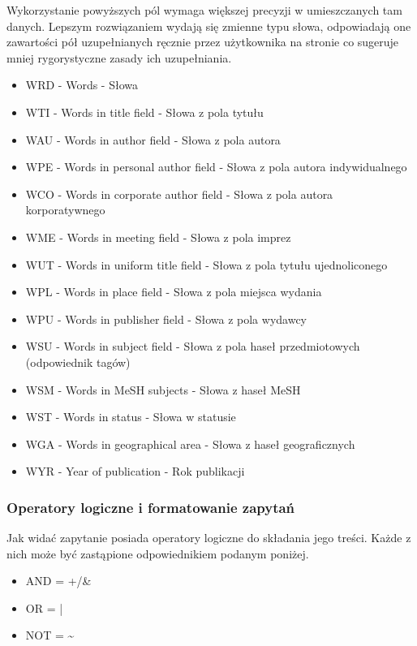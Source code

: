 \documentclass{report}
\begin{document}
				Wykorzystanie powyższych pól wymaga większej precyzji w umieszczanych tam danych. Lepszym rozwiązaniem wydają się zmienne typu słowa, odpowiadają one zawartości pół uzupełnianych ręcznie przez użytkownika na stronie co sugeruje mniej rygorystyczne zasady ich uzupełniania.
				
				\begin{itemize}
					\item WRD - Words - Słowa
					\item WTI - Words in title field - Słowa z pola tytułu
					\item WAU - Words in author field - Słowa z pola autora
					\item WPE - Words in personal author field - Słowa z pola autora indywidualnego
					\item WCO - Words in corporate author field - Słowa z pola autora korporatywnego
					\item WME - Words in meeting field - Słowa z pola imprez
					\item WUT - Words in uniform title field - Słowa z pola tytułu ujednoliconego
					\item WPL - Words in place field - Słowa z pola miejsca wydania
					\item WPU - Words in publisher field - Słowa z pola wydawcy
					\item WSU - Words in subject field - Słowa z pola haseł przedmiotowych (odpowiednik tagów)
					\item WSM - Words in MeSH subjects - Słowa z haseł MeSH
					\item WST - Words in status - Słowa w statusie
					\item WGA - Words in geographical area - Słowa z haseł geograficznych
					\item WYR - Year of publication - Rok publikacji 
				\end{itemize}
		
			\subsubsection{Operatory logiczne i formatowanie zapytań}
			
				Jak widać zapytanie posiada operatory logiczne do składania jego treści. Każde z nich może być zastąpione odpowiednikiem podanym poniżej.
				
				\begin{itemize}
					\item AND = +/\&
					\item OR = |
					\item NOT = \textasciitilde
				\end{itemize}
				
\end{document}
